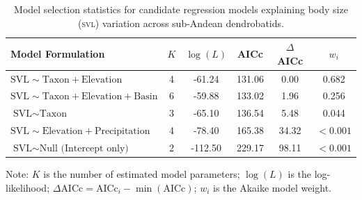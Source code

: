 \begin{table}[htbp]
  \centering
  \small
  \caption{Model selection statistics for candidate regression models explaining body size (\textsc{svl}) variation across sub-Andean dendrobatids.}
  \label{tab:aicc_models}
  \begin{tabular}{lccccc}
    \toprule
    \textbf{Model Formulation} & \textbf{$K$} & \textbf{$\log(L)$} & \textbf{AICc} & \textbf{$\Delta$AICc} & \textbf{$w_i$} \\
    \midrule
    $\text{SVL} \sim \text{Taxon} + \text{Elevation}$ & 4 & -61.24 & 131.06 & 0.00 & 0.682 \\
    $\text{SVL} \sim \text{Taxon} + \text{Elevation} + \text{Basin}$ & 6 & -59.88 & 133.02 & 1.96 & 0.256 \\
    $\text{SVL} \sim \text{Taxon}$ & 3 & -65.10 & 136.54 & 5.48 & 0.044 \\
    $\text{SVL} \sim \text{Elevation} + \text{Precipitation}$ & 4 & -78.40 & 165.38 & 34.32 & $<0.001$ \\
    $\text{SVL} \sim \text{Null (Intercept only)}$ & 2 & -112.50 & 229.17 & 98.11 & $<0.001$ \\
    \bottomrule
  \end{tabular}
\end{table}

\noindent
\footnotesize{Note: $K$ is the number of estimated model parameters; $\log(L)$ is the log-likelihood; $\Delta\text{AICc} = \text{AICc}_i - \min(\text{AICc})$; $w_i$ is the Akaike model weight.}
